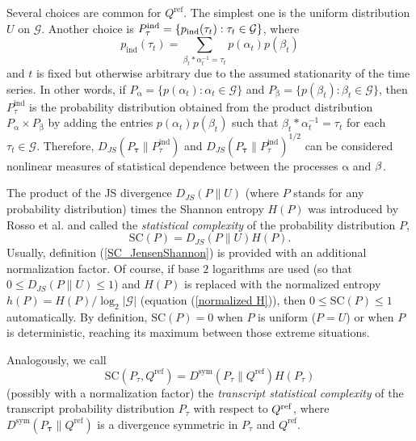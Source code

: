\documentclass[%
 aip,
 amsmath,amssymb,
 reprint,%
]{revtex4-1}
\begin{document}
Several choices are common for $Q^{\mathrm{ref}}$. The simplest one is the
uniform distribution $U$ on $\mathcal{G}$. Another choice is $P_{\tau }^{%
\mathrm{ind}}=\{p_{\mathrm{ind}}(\tau _{t}):\tau _{t}\in \mathcal{G}\}$,
where \cite{Monetti2009} 
\begin{equation}
p_{\mathrm{ind}}(\tau _{t})=\sum_{\beta _{t}\ast \alpha _{t}^{-1}=\tau
_{t}}p(\alpha _{t})p(\beta _{t})  \label{Pind}
\end{equation}%
and $t$ is fixed but otherwise arbitrary due to the assumed stationarity of the time series. In other words, if $P_{\mathrm{\alpha }}=\{p(\alpha _{t}):\alpha _{t}\in 
\mathcal{G}\}$ and $P_{\mathrm{\beta }}=\{p(\beta _{t}):\beta _{t}\in 
\mathcal{G}\}$, then $P_{\tau }^{\mathrm{ind}}$ is the probability
distribution obtained from the product distribution $P_{\mathrm{\alpha }%
}\times P_{\mathrm{\beta }}$ by adding the entries $p(\alpha _{t})p(\beta
_{t})$ such that $\beta _{t}\ast \alpha _{t}^{-1}=\tau _{t}$ for each $\tau
_{t}\in \mathcal{G}$. Therefore, $D_{JS}(P_{\mathbf{\tau }}\parallel P_{\tau
}^{\mathrm{ind}})$ and $D_{JS}(P_{\mathbf{\tau }}\parallel
P_{\tau }^{\mathrm{ind}})^{1/2}$ can be considered nonlinear measures of
statistical dependence between the processes $\mathrm{\alpha }$ and $\mathrm{%
\beta }$.

The product of the JS divergence $D_{JS}(P\parallel U)$ (where $P$ stands
for any probability distribution) times the Shannon entropy $H(P)$ was
introduced by Rosso et al. \cite{Rosso2007} and called the \textit{%
statistical complexity }of the probability distribution $P$,%
\begin{equation}
\mathrm{SC}(P)=D_{JS}(P\parallel U)H(P).  \label{SC_JensenShannon}
\end{equation}%
Usually, definition (\ref{SC_JensenShannon}) is provided with an additional
normalization factor. Of course, if base $2$ logarithms are used (so that $%
0\leq D_{JS}(P\parallel U)\leq 1$) and $H(P)$ is replaced with the
normalized entropy $h(P)=H(P)/\log _{2}\left\vert \mathcal{G}\right\vert $
(equation (\ref{normalized H})), then $0\leq \mathrm{SC}(P)\leq 1$
automatically. By definition, $\mathrm{SC}(P)=0$ when $P$ is uniform ($P=U$)
or when $P$ is deterministic, reaching its maximum between those extreme
situations.

Analogously, we call%
\begin{equation}
\mathrm{SC}(P_{\tau},Q^{\mathrm{ref}})=D^{\mathrm{sym}}(P_{\tau}\parallel Q^{\mathrm{ref}%
})H(P_{\tau})  \label{SC(P)}
\end{equation}%
(possibly with a normalization factor) the \textit{transcript statistical
complexity} of the transcript probability distribution $P_{\tau}$ with respect to $Q^{\mathrm{%
ref}}$, where $D^{\mathrm{sym}}(P_{\mathbf{\tau }}\parallel Q^{\mathrm{ref}%
}) $ is a divergence symmetric in $P_{\tau}$ and $Q^{\mathrm{ref}}$.
\end{document}
